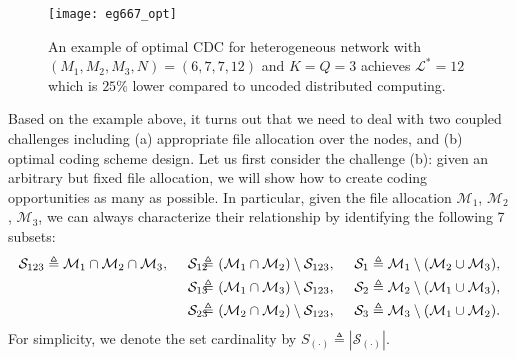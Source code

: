 \documentclass[conference]{IEEEtran}
\begin{document}
\begin{figure}[!t] \centering %
\texttt{[image: eg667\_opt]}%
\caption{An example of optimal CDC for heterogeneous network with $(M_1,M_2,M_3,N)=(6,7,7,12)$ and $K=Q=3$ achieves ${\mathcal L}^*=12$ which is $25\%$ lower compared to uncoded distributed computing.}\label{coding_ex}%
\end{figure}


Based on the example above, it turns out that we need to deal with two coupled challenges including (a) appropriate file allocation over the nodes, and (b) optimal coding scheme design. Let us first consider the challenge (b): given an arbitrary but fixed file allocation, we will show how to create coding opportunities as many as possible. %
In particular, given the file allocation $\mathcal{M}_1$, $\mathcal{M}_2$, $\mathcal{M}_3$, we can always characterize their relationship by identifying the following 7 subsets:
\begin{eqnarray*}
\mathcal{S}_{123}\triangleq\mathcal{M}_1\cap \mathcal{M}_2 \cap\mathcal{M}_3,~~~~\notag\mathcal{S}_{12}&\!\!\!\!\triangleq\!\!\!\!&(\mathcal{M}_1\cap \mathcal{M}_2) \setminus \mathcal{S}_{123},~~~~\mathcal{S}_1\triangleq\mathcal{M}_1 \setminus (\mathcal{M}_2\cup \mathcal{M}_3),\notag\\
\mathcal{S}_{13}&\!\!\!\!\triangleq\!\!\!\!&(\mathcal{M}_1\cap \mathcal{M}_3) \setminus \mathcal{S}_{123},~~~~\mathcal{S}_2\triangleq\mathcal{M}_2 \setminus (\mathcal{M}_1\cup \mathcal{M}_3),\notag\\
\mathcal{S}_{23}&\!\!\!\!\triangleq\!\!\!\!&(\mathcal{M}_2\cap \mathcal{M}_2) \setminus \mathcal{S}_{123},~~~~\mathcal{S}_3\triangleq\mathcal{M}_3 \setminus (\mathcal{M}_1\cup \mathcal{M}_2).
\end{eqnarray*}
For simplicity, we denote the set cardinality by $S_{(\cdot)}\triangleq |\mathcal{S}_{(\cdot)}|$.

\end{document}
